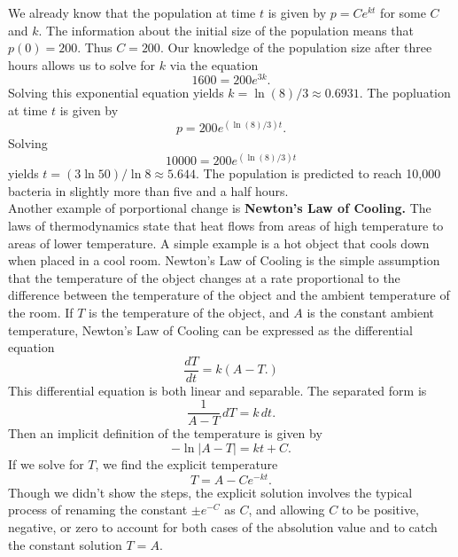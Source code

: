 {We already know that the population at time $t$ is given by $p = Ce^{kt}$ for some $C$ and $k$.  The information about the initial size of the population means that $p(0)=200.$ Thus $C=200.$  Our knowledge of the population size after three hours allows us to solve for $k$ via the equation
	\[
		1600 = 200e^{3k}.
	\]
Solving this exponential equation yields $k =\ln(8)/3 \approx 0.6931.$  The popluation at time $t$ is given by
	\[
		p = 200 e^{(\ln(8)/3)t}.
	\]
Solving
	\[
		10000 = 200e^{(\ln(8)/3)t}
	\]
yields $t =(3\ln 50)/\ln 8 \approx 5.644.$  The population is predicted to reach 10,000 bacteria in slightly more than five and a half hours.
}\\

Another example of porportional change is \textbf{Newton's Law of Cooling.} The laws of thermodynamics state that heat flows from areas of high temperature to areas of lower temperature.  A simple example is a hot object that cools down when placed in a cool room.  Newton's Law of Cooling is the simple assumption that the temperature of the object changes at a rate proportional to the difference between the temperature of the object and the ambient temperature of the room.  If $T$ is the temperature of the object, and $A$ is the constant ambient temperature, Newton's Law of Cooling can be expressed as the differential equation
	\[
		\frac{dT}{dt} = k(A - T.)
	\]
This differential equation is both linear and separable. The separated form is
	\[
		\frac{1}{A-T}\,dT = k\,dt.
	\]
Then an implicit definition of the temperature is given by
	\[
		-\ln|A-T| = kt + C.
	\]
If we solve for $T$, we find the explicit temperature
	\[
		T = A-Ce^{-kt}.
	\]
Though we didn't show the steps, the explicit solution involves the typical process of renaming the constant $\pm e^{-C}$ as $C$, and allowing $C$ to be positive, negative, or zero to account for both cases of the absolution value and to catch the constant solution $T=A.$


